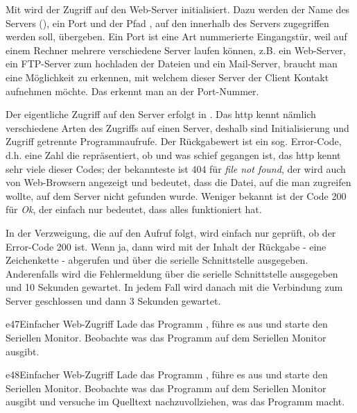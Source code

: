 Mit  wird der Zugriff auf den Web-Server initialisiert. Dazu werden der Name des Servers
(), ein Port  und der Pfad , auf den innerhalb des Servers zugegriffen werden soll, übergeben.
Ein Port ist eine Art nummerierte Eingangstür, weil auf einem Rechner mehrere verschiedene Server laufen
können, z.B. ein Web-Server, ein FTP-Server zum hochladen der Dateien und ein Mail-Server, braucht man eine
Möglichkeit zu erkennen, mit welchem dieser Server der Client Kontakt aufnehmen möchte. Das erkennt man an
der Port-Nummer.

Der eigentliche Zugriff auf den Server erfolgt in . Das http kennt nämlich verschiedene Arten des
Zugriffs auf einen Server, deshalb sind Initialisierung und Zugriff getrennte Programmaufrufe. 
Der Rückgabewert ist ein sog. Error-Code, d.h. eine Zahl die repräsentiert, ob und was schief gegangen ist,
das http kennt sehr viele dieser Codes; der bekannteste ist 404 für \emph{file not found}, der wird auch 
von Web-Browsern angezeigt und bedeutet, dass die Datei, auf die man zugreifen wollte, auf dem Server nicht
gefunden wurde. Weniger bekannt ist der Code 200 für \emph{Ok}, der einfach nur bedeutet, dass alles funktioniert
hat.

In der Verzweigung, die auf den Aufruf folgt, wird einfach nur geprüft, ob der Error-Code 200 ist. Wenn ja, dann 
wird mit  der Inhalt der Rückgabe - eine Zeichenkette - abgerufen und über die serielle
Schnittstelle ausgegeben. Anderenfalls wird die Fehlermeldung über die serielle Schnittstelle ausgegeben und 
10 Sekunden gewartet. In jedem Fall wird danach mit  die Verbindung zum Server geschlossen und 
dann 3 Sekunden gewartet. 

\begin{excercise}{e47}{Einfacher Web-Zugriff}
Lade das Programm , führe es aus und starte den Seriellen Monitor.
Beobachte was das Programm auf dem Seriellen Monitor ausgibt.
\end{excercise}

\begin{excercise}{e48}{Einfacher Web-Zugriff}
Lade das Programm , führe es aus und starte den Seriellen Monitor.
Beobachte was das Programm auf dem Seriellen Monitor ausgibt und versuche im Quelltext
nachzuvollziehen, was das Programm macht.
\end{excercise}

\vfill\null\pagebreak
{}

